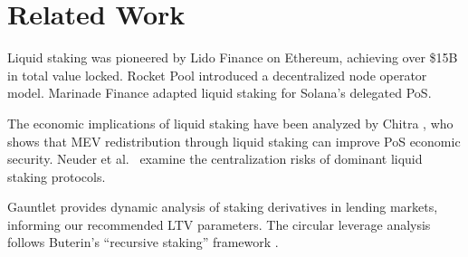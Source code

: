 \section{Related Work}
\label{sec:related}

Liquid staking was pioneered by Lido Finance \cite{lidofinance} on Ethereum, achieving over \$15B in total value locked. Rocket Pool \cite{rocketpool} introduced a decentralized node operator model. Marinade Finance \cite{marinade} adapted liquid staking for Solana's delegated PoS.

The economic implications of liquid staking have been analyzed by Chitra \cite{chitra2022improving}, who shows that MEV redistribution through liquid staking can improve PoS economic security. Neuder et al.\ \cite{neuder2021} examine the centralization risks of dominant liquid staking protocols.

Gauntlet \cite{gauntlet2022} provides dynamic analysis of staking derivatives in lending markets, informing our recommended LTV parameters. The circular leverage analysis follows Buterin's ``recursive staking'' framework \cite{buterin2020recursive}.

